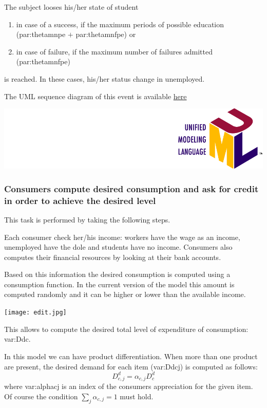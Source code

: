 \documentclass{book}
\newcommand{\doclocation}{file:///Users/giulioni/Documents/workspace/gabriele/docs}
\begin{document}
The subject looses his/her state of student 
\begin{enumerate}
	\item in case of a success, if the maximum periods of possible education (\gls{par:thetamnpe} $+$ \gls{par:thetamnfpe}) or
	\item in case of failure, if the maximum number of failures admitted (\gls{par:thetamnfpe})
\end{enumerate}
is reached. In these cases, his/her status change in unemployed.

The UML sequence diagram of this event is available \href{\doclocation/umldoc/stepStudentState.html}{here}
\begin{marginfigure}
	\includegraphics[scale=0.1]{uml.png}
\end{marginfigure}


\subsubsection{Consumers compute desired consumption and ask for credit in order to achieve the desired level}
This task is performed by taking the following steps.

Each consumer check her/his income: workers have the wage as an income, unemployed have the dole and students have no income. Consumers also computes their financial resources by looking at their bank accounts. 

Based on this information the desired consumption is computed using a consumption function. In the current version of the model this amount is computed randomly and it can be higher or lower than the available income. 
\begin{marginfigure}
	\hskip2.5cm\texttt{[image: edit.jpg]}
\end{marginfigure}


This allows to compute the desired total level of expenditure of consumption: \gls{var:Ddc}.

In this model we can have product differentiation. When more than one product are present, the desired demand for each item (\gls{var:Ddcj}) is computed as follows:
\[
	D_{c,j}^d=\alpha_{c,j}D^d_{c}
\]
where \gls{var:alphacj} is an index of the consumers appreciation for the given item. Of course the condition $\sum_j \alpha_{c,j}=1$ must hold.
\end{document}
